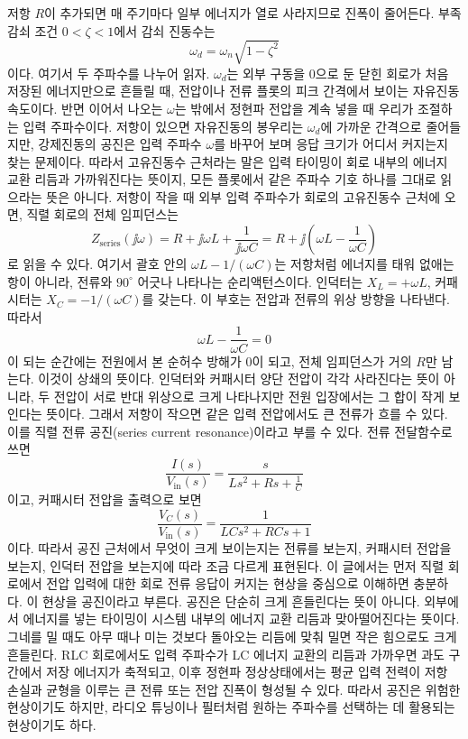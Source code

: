 저항 $R$이 추가되면 매 주기마다 일부 에너지가 열로 사라지므로 진폭이 줄어든다.
부족감쇠 조건 $0<\zeta<1$에서 감쇠 진동수는
\begin{equation}
  \omega_d = \omega_n\sqrt{1-\zeta^2}
\end{equation}
이다.
여기서 두 주파수를 나누어 읽자.
$\omega_d$는 외부 구동을 0으로 둔 닫힌 회로가 처음 저장된 에너지만으로 흔들릴 때, 전압이나 전류 플롯의 피크 간격에서 보이는 자유진동 속도이다.
반면 이어서 나오는 $\omega$는 밖에서 정현파 전압을 계속 넣을 때 우리가 조절하는 입력 주파수이다.
저항이 있으면 자유진동의 봉우리는 $\omega_d$에 가까운 간격으로 줄어들지만, 강제진동의 공진은 입력 주파수 $\omega$를 바꾸어 보며 응답 크기가 어디서 커지는지 찾는 문제이다.
따라서 고유진동수 근처라는 말은 입력 타이밍이 회로 내부의 에너지 교환 리듬과 가까워진다는 뜻이지, 모든 플롯에서 같은 주파수 기호 하나를 그대로 읽으라는 뜻은 아니다.
저항이 작을 때 외부 입력 주파수가 회로의 고유진동수 근처에 오면, 직렬 회로의 전체 임피던스는
\begin{equation}
  Z_{\mathrm{series}}(\jj\omega)
  =
  R+\jj\omega L+\frac{1}{\jj\omega C}
  =
  R+\jj\left(\omega L-\frac{1}{\omega C}\right)
\end{equation}
로 읽을 수 있다.
여기서 괄호 안의 $\omega L-1/(\omega C)$는 저항처럼 에너지를 태워 없애는 항이 아니라, 전류와 $90^\circ$ 어긋나 나타나는 순리액턴스이다.
인덕터는 $X_L=+\omega L$, 커패시터는 $X_C=-1/(\omega C)$를 갖는다.
이 부호는 전압과 전류의 위상 방향을 나타낸다.
따라서
\begin{equation}
  \omega L-\frac{1}{\omega C}=0
\end{equation}
이 되는 순간에는 전원에서 본 순허수 방해가 0이 되고, 전체 임피던스가 거의 $R$만 남는다.
이것이 상쇄의 뜻이다.
인덕터와 커패시터 양단 전압이 각각 사라진다는 뜻이 아니라, 두 전압이 서로 반대 위상으로 크게 나타나지만 전원 입장에서는 그 합이 작게 보인다는 뜻이다.
그래서 저항이 작으면 같은 입력 전압에서도 큰 전류가 흐를 수 있다.
이를 직렬 전류 공진(series current resonance)이라고 부를 수 있다.
전류 전달함수로 쓰면
\begin{equation}
  \frac{I(s)}{V_{\mathrm{in}}(s)}
  =
  \frac{s}{Ls^2+Rs+\frac{1}{C}}
\end{equation}
이고, 커패시터 전압을 출력으로 보면
\begin{equation}
  \frac{V_C(s)}{V_{\mathrm{in}}(s)}
  =
  \frac{1}{LCs^2+RCs+1}
\end{equation}
이다.
따라서 공진 근처에서 무엇이 크게 보이는지는 전류를 보는지, 커패시터 전압을 보는지, 인덕터 전압을 보는지에 따라 조금 다르게 표현된다.
이 글에서는 먼저 직렬 회로에서 전압 입력에 대한 회로 전류 응답이 커지는 현상을 중심으로 이해하면 충분하다.
이 현상을 공진이라고 부른다.
공진은 단순히 크게 흔들린다는 뜻이 아니다.
외부에서 에너지를 넣는 타이밍이 시스템 내부의 에너지 교환 리듬과 맞아떨어진다는 뜻이다.
그네를 밀 때도 아무 때나 미는 것보다 돌아오는 리듬에 맞춰 밀면 작은 힘으로도 크게 흔들린다.
RLC 회로에서도 입력 주파수가 LC 에너지 교환의 리듬과 가까우면 과도 구간에서 저장 에너지가 축적되고, 이후 정현파 정상상태에서는 평균 입력 전력이 저항 손실과 균형을 이루는 큰 전류 또는 전압 진폭이 형성될 수 있다.
따라서 공진은 위험한 현상이기도 하지만, 라디오 튜닝이나 필터처럼 원하는 주파수를 선택하는 데 활용되는 현상이기도 하다.

